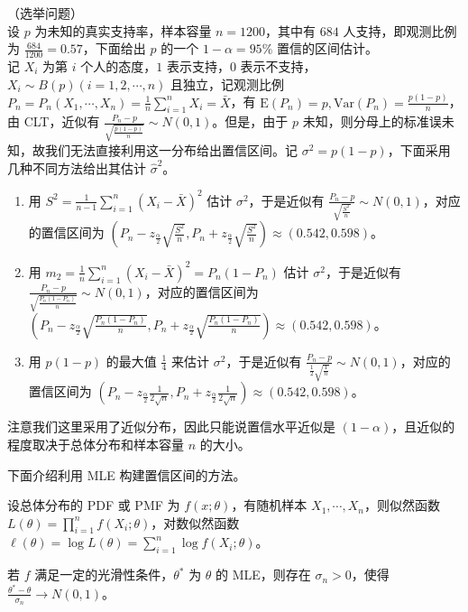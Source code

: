 \documentclass[../main.tex]{subfiles}
\begin{document}
\begin{example}
    （选举问题）\\
    设 $p$ 为未知的真实支持率，样本容量 $n=1200$，其中有 $684$ 人支持，即观测比例为 $\frac{684}{1200}=0.57$，下面给出 $p$ 的一个 $1-\alpha=95\%$ 置信的区间估计。\\
    记 $X_i$ 为第 $i$ 个人的态度，$1$ 表示支持，$0$ 表示不支持，$X_i\sim B(p)(i=1,2,\cdots,n)$ 且独立，记观测比例 $P_n=P_n(X_1,\cdots,X_n)=\frac1n\sum_{i=1}^nX_i=\bar X$，有 $\mathrm E(P_n)=p,\mathrm{Var}(P_n)=\frac{p(1-p)}n$，由 CLT，近似有 $\frac{P_n-p}{\sqrt{\frac{p(1-p)}n}}\sim N(0,1)$。但是，由于 $p$ 未知，则分母上的标准误未知，故我们无法直接利用这一分布给出置信区间。记 $\sigma^2=p(1-p)$，下面采用几种不同方法给出其估计 $\hat\sigma^2$。
    \begin{enumerate}
        \item 用 $S^2=\frac1{n-1}\sum_{i=1}^n(X_i-\bar X)^2$ 估计 $\sigma^2$，于是近似有 $\frac{P_n-p}{\sqrt{\frac{S^2}n}}\sim N(0,1)$，对应的置信区间为 $(P_n-z_{\frac\alpha2}\sqrt{\frac{S^2}n},P_n+z_{\frac\alpha2}\sqrt{\frac{S^2}n})\approx(0.542,0.598)$。
        \item 用 $m_2=\frac1n\sum_{i=1}^n(X_i-\bar X)^2=P_n(1-P_n)$ 估计 $\sigma^2$，于是近似有 $\frac{P_n-p}{\sqrt{\frac{P_n(1-P_n)}n}}\sim N(0,1)$，对应的置信区间为 $(P_n-z_{\frac\alpha2}\sqrt{\frac{P_n(1-P_n)}n},P_n+z_{\frac\alpha2}\sqrt{\frac{P_n(1-P_n)}n})\approx(0.542,0.598)$。
        \item 用 $p(1-p)$ 的最大值 $\frac14$ 来估计 $\sigma^2$，于是近似有 $\frac{P_n-p}{\frac12\sqrt{\frac1n}}\sim N(0,1)$，对应的置信区间为 $(P_n-z_{\frac\alpha2}\frac1{2\sqrt{n}},P_n+z_{\frac\alpha2}\frac1{2\sqrt{n}})\approx(0.542,0.598)$。
    \end{enumerate}
\end{example}

注意我们这里采用了近似分布，因此只能说置信水平近似是 $(1-\alpha)$，且近似的程度取决于总体分布和样本容量 $n$ 的大小。

下面介绍利用 MLE 构建置信区间的方法。

设总体分布的 PDF 或 PMF 为 $f(x;\theta)$，有随机样本 $X_1,\cdots,X_n$，则似然函数 $L(\theta)=\prod_{i=1}^nf(X_i;\theta)$，对数似然函数 $\ell(\theta)=\log L(\theta)=\sum_{i=1}^n\log f(X_i;\theta)$。

\begin{theorem}\label{thm:6.4.1}
    若 $f$ 满足一定的光滑性条件，$\theta^*$ 为 $\theta$ 的 MLE，则存在 $\sigma_n>0$，使得 $\frac{\theta^*-\theta}{\sigma_n}\rightarrow N(0,1)$。
\end{theorem}
\end{document}
